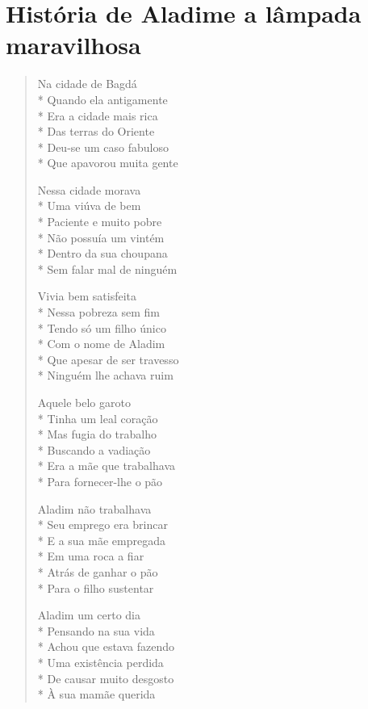 
\chapter[História de Aladim e a lâmpada maravilhosa]{História de Aladim\break e a lâmpada maravilhosa}

\begin{verse}
Na cidade de Bagdá\\*
Quando ela antigamente\\*
Era a cidade mais rica\\*
Das terras do Oriente\\*
Deu-se um caso fabuloso\\*
Que apavorou muita gente

Nessa cidade morava\\*
Uma viúva de bem\\*
Paciente e muito pobre\\*
Não possuía um vintém\\*
Dentro da sua choupana\\*
Sem falar mal de ninguém

Vivia bem satisfeita\\*
Nessa pobreza sem fim\\*
Tendo só um filho único\\*
Com o nome de Aladim\\*
Que apesar de ser travesso\\*
Ninguém lhe achava ruim

Aquele belo garoto\\*
Tinha um leal coração\\*
Mas fugia do trabalho\\*
Buscando a vadiação\\*
Era a mãe que trabalhava\\*
Para fornecer-lhe o pão

Aladim não trabalhava\\*
Seu emprego era brincar\\*
E a sua mãe empregada\\*
Em uma roca a fiar\\*
Atrás de ganhar o pão\\*
Para o filho sustentar

Aladim um certo dia\\*
Pensando na sua vida\\*
Achou que estava fazendo\\*
Uma existência perdida\\*
De causar muito desgosto\\*
À sua mamãe querida


\end{verse}
